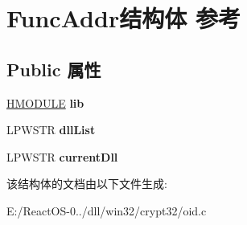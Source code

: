 \hypertarget{struct_func_addr}{}\section{Func\+Addr结构体 参考}
\label{struct_func_addr}
\subsection*{Public 属性}
\begin{DoxyCompactItemize}
\item 
\mbox{\label{struct_func_addr_ad80d19da355bf35078f476ca42a1a272}} 
\hyperlink{interfacevoid}{H\+M\+O\+D\+U\+LE} {\bfseries lib}
\item 
\mbox{\label{struct_func_addr_a61ce309a192d6f0d5d6c31f95345efe3}} 
L\+P\+W\+S\+TR {\bfseries dll\+List}
\item 
\mbox{\label{struct_func_addr_a1ec435da6367780ab221e6d6fc9c332f}} 
L\+P\+W\+S\+TR {\bfseries current\+Dll}
\end{DoxyCompactItemize}


该结构体的文档由以下文件生成\+:\begin{DoxyCompactItemize}
\item 
E\+:/\+React\+O\+S-\/0../dll/win32/crypt32/oid.\+c\end{DoxyCompactItemize}
